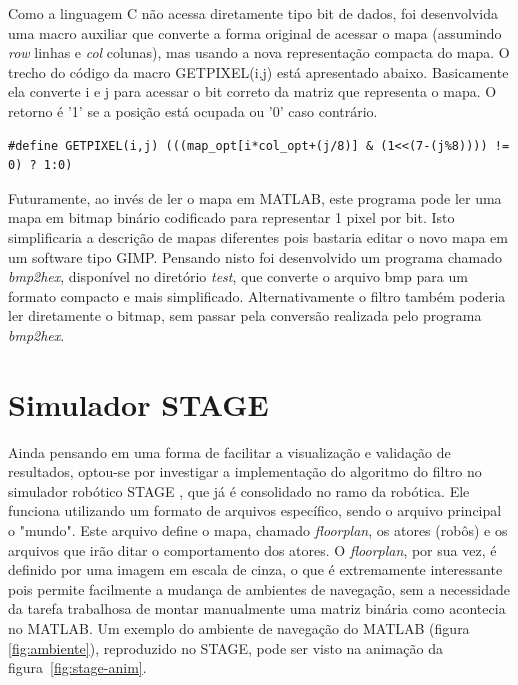 \documentclass[
	12pt,				%
	openright,			%
	oneside,			%
	a4paper,			%
	english,			%
	french,				%
	spanish,			%
	brazil,				%
	]{abntex2}
\begin{document}
Como a linguagem C não acessa diretamente tipo bit de dados, foi desenvolvida uma macro auxiliar que converte a forma original de acessar o mapa (assumindo \emph{row} linhas e \emph{col} colunas), mas usando a nova representação compacta do mapa. O trecho do código da macro GETPIXEL(i,j) está apresentado abaixo. Basicamente ela converte i e j para acessar o bit correto da matriz que representa o mapa. O retorno é '1' se a posição está ocupada ou '0' caso contrário.

\begin{lstlisting}[style=customc,numbers=none,basicstyle=\footnotesize]
#define GETPIXEL(i,j) (((map_opt[i*col_opt+(j/8)] & (1<<(7-(j%8)))) != 0) ? 1:0)
\end{lstlisting}

Futuramente, ao invés de ler o mapa em MATLAB, este programa pode ler uma mapa em bitmap binário codificado para representar 1 pixel por bit. Isto simplificaria a descrição de mapas diferentes pois bastaria editar o novo mapa em um software tipo GIMP. Pensando nisto foi desenvolvido um programa chamado \emph{bmp2hex}, disponível no diretório \emph{test}, que converte o arquivo bmp para um formato compacto e mais simplificado. Alternativamente o filtro também poderia ler diretamente o bitmap, sem passar pela conversão realizada pelo programa \emph{bmp2hex}.


\section{Simulador STAGE}
\label{sec:stage}

Ainda pensando em uma forma de facilitar a visualização e validação de resultados, optou-se por investigar a implementação do algoritmo do filtro no simulador robótico STAGE \cite{vaughan2008massively}, que já é consolidado no ramo da robótica. Ele funciona utilizando um formato de arquivos específico, sendo o arquivo principal o "mundo". Este arquivo define o mapa, chamado \emph{floorplan}, os atores (robôs) e os arquivos que irão ditar o comportamento dos atores. O \emph{floorplan}, por sua vez, é definido por uma imagem em escala de cinza, o que é extremamente interessante pois permite facilmente a mudança de ambientes de navegação, sem a necessidade da tarefa trabalhosa de montar manualmente uma matriz binária como acontecia no MATLAB. Um exemplo do ambiente de navegação do MATLAB  (figura \ref{fig:ambiente}), reproduzido no STAGE, pode ser visto na animação da figura~\ref{fig:stage-anim}.
\end{document}
